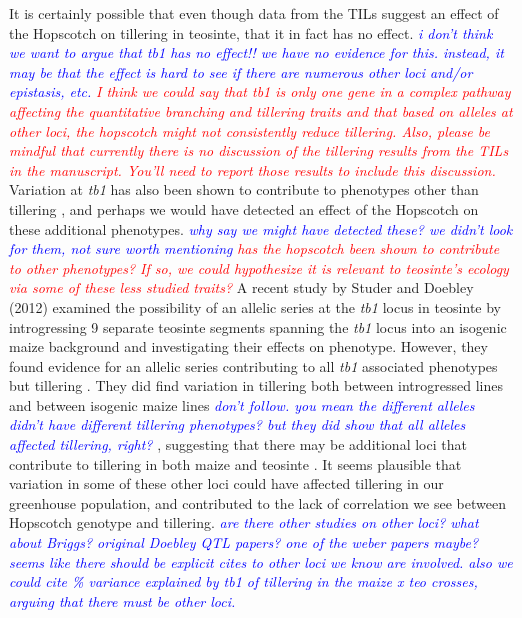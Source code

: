 \documentclass[12pt]{article}
\newcommand{\jri}[1]{\textcolor{blue}{ \emph{\scriptsize  #1}} }
\newcommand{\mbh}[1]{\textcolor{red}{ \emph{\scriptsize  #1}} }
\begin{document}
It is certainly possible that even though data from the TILs suggest an effect of the Hopscotch on tillering in teosinte, that it in fact has no effect. \jri{i don't think we want to argue that tb1 has no effect!! we have no evidence for this. instead, it may be that the effect is hard to see if there are numerous other loci and/or epistasis, etc.} \mbh{I think we could say that \emph{tb1} is only one gene in a complex pathway affecting the quantitative branching and tillering traits and that based on alleles at other loci, the hopscotch might not consistently reduce tillering.  Also, please be mindful that currently there is no discussion of the tillering results from the TILs in the manuscript.  You'll need to report those results to include this discussion.} Variation at \emph{tb1} has also been shown to contribute to phenotypes other than tillering \cite{Clark et al 2006}, and perhaps we would have detected an effect of the Hopscotch on these additional phenotypes. \jri{why say we might have detected these? we didn't look for them, not sure worth mentioning}  \mbh{has the hopscotch been shown to contribute to other phenotypes? If so, we could hypothesize it is relevant to teosinte's ecology via some of these less studied traits?} A recent study by Studer and Doebley (2012) examined the possibility of an allelic series at the \emph{tb1} locus in teosinte by introgressing 9 separate teosinte segments spanning the \emph{tb1} locus into an isogenic maize background and investigating their effects on phenotype. However, they found evidence for an allelic series contributing to all \emph{tb1} associated phenotypes but tillering . They did find variation in tillering both between introgressed lines and between isogenic maize lines \jri{don't follow. you mean the different alleles didn't have different tillering phenotypes? but they did show that all alleles affected tillering, right?}, suggesting that there may be additional loci that contribute to tillering in both maize and teosinte \cite{Studer and Doebley 2012}. It seems plausible that variation in some of these other loci could have affected tillering in our greenhouse population, and contributed to the lack of correlation we see between Hopscotch genotype and tillering. \jri{are there other studies on other loci? what about Briggs? original Doebley QTL papers? one of the weber papers maybe? seems like there should be explicit cites to other loci we know are involved.  also we could cite \% variance explained by tb1 of tillering in the maize x teo crosses, arguing that there must be other loci.}
\end{document}
